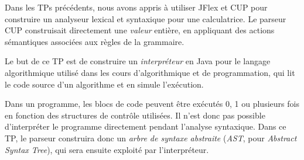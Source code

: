 \documentclass{td}
\begin{document}



Dans les TPs précédents, nous avons appris à utiliser JFlex et CUP pour construire
un analyseur lexical et syntaxique pour une calculatrice.
Le parseur CUP construisait directement une \emph{valeur} entière,
en appliquant des actions sémantiques associées aux règles de la grammaire.

Le but de ce TP est de construire un \emph{interpréteur} en Java pour le langage algorithmique
utilisé dans les cours d'algorithmique et de programmation, qui lit le code source d'un algorithme
et en simule l'exécution.

Dans un programme, les blocs de code peuvent être exécutés 0, 1 ou plusieurs fois en fonction des
structures de contrôle utilisées. Il n'est donc pas possible d'interpréter le programme directement
pendant l'analyse syntaxique. Dans ce TP, le parseur construira donc un \emph{arbre de syntaxe abstraite}
(\emph{AST}, pour \emph{Abstract Syntax Tree}), qui sera ensuite exploité par l'interpréteur.
\end{document}
